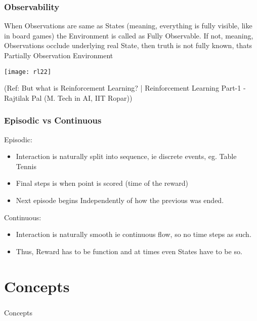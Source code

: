 \begin{frame}[fragile]\frametitle{Observability}
When Observations are same as States (meaning, everything is fully visible, like in board games) the Environment is called as Fully Observable. If not, meaning, Observations occlude underlying real State, then truth is not fully known, thats Partially Observation Environment

\begin{center}
\texttt{[image: rl22]}
\end{center}

{\tiny (Ref: But what is Reinforcement Learning? | Reinforcement Learning Part-1 - Rajtilak Pal (M. Tech in AI, IIT Ropar))}

\end{frame}

\begin{frame}[fragile]\frametitle{Episodic vs Continuous}

Episodic:
\begin{itemize}
\item Interaction is naturally split into sequence, ie discrete events, eg. Table Tennis
\item Final steps is when point is scored (time of the reward)
\item Next episode begins Independently of how the previous was ended.
\end{itemize}

Continuous:
\begin{itemize}
\item Interaction is naturally smooth ie continuous flow, so no time steps as such.
\item Thus, Reward has to be function and at times even States have to be so.
\end{itemize}

\end{frame}

\section[Concepts]{Concepts}

\begin{frame}[fragile]\frametitle{}
\begin{center}
{\Large Concepts}
\end{center}
\end{frame}


